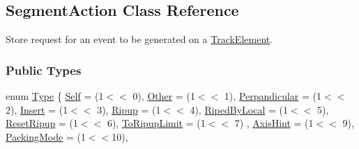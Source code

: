 \hypertarget{classKite_1_1SegmentAction}{}\subsection{Segment\+Action Class Reference}
\label{classKite_1_1SegmentAction}


Store request for an event to be generated on a \hyperlink{classKite_1_1TrackElement}{Track\+Element}.  


\subsubsection*{Public Types}
\begin{DoxyCompactItemize}
\item 
enum \hyperlink{classKite_1_1SegmentAction_a1d1cfd8ffb84e947f82999c682b666a7}{Type} \{ \newline
\hyperlink{classKite_1_1SegmentAction_a1d1cfd8ffb84e947f82999c682b666a7aacd3ef9d889b306ca7e7bdcd37ba659a}{Self} = (1$<$$<$ 0), 
\newline
\hyperlink{classKite_1_1SegmentAction_a1d1cfd8ffb84e947f82999c682b666a7a75f0c3176be2226dfe8ad164a0a034a2}{Other} = (1$<$$<$ 1), 
\newline
\hyperlink{classKite_1_1SegmentAction_a1d1cfd8ffb84e947f82999c682b666a7a02330ea306385a34162a1e620a1c37df}{Perpandicular} = (1$<$$<$ 2), 
\newline
\hyperlink{classKite_1_1SegmentAction_a1d1cfd8ffb84e947f82999c682b666a7a8c1f14f07c9eedcbbb2cc61988030646}{Insert} = (1$<$$<$ 3), 
\newline
\hyperlink{classKite_1_1SegmentAction_a1d1cfd8ffb84e947f82999c682b666a7a08900dc237aef7e4a7f50d2ba1ffd748}{Ripup} = (1$<$$<$ 4), 
\newline
\hyperlink{classKite_1_1SegmentAction_a1d1cfd8ffb84e947f82999c682b666a7a4fab9c042ba690bdb62d3c34eab8472d}{Riped\+By\+Local} = (1$<$$<$ 5), 
\newline
\hyperlink{classKite_1_1SegmentAction_a1d1cfd8ffb84e947f82999c682b666a7a9e16316a13899c2e02dd49cf2fb6e91f}{Reset\+Ripup} = (1$<$$<$ 6), 
\newline
\hyperlink{classKite_1_1SegmentAction_a1d1cfd8ffb84e947f82999c682b666a7a6c00c46010d69247a3edc18b70d700fa}{To\+Ripup\+Limit} = (1$<$$<$ 7)
, \newline
\hyperlink{classKite_1_1SegmentAction_a1d1cfd8ffb84e947f82999c682b666a7a46c4ca7a69b5eae786be28f75523b78b}{Axis\+Hint} = (1$<$$<$ 9), 
\newline
\hyperlink{classKite_1_1SegmentAction_a1d1cfd8ffb84e947f82999c682b666a7a4fe6b9a3b3816492b9a99ab6689c4b20}{Packing\+Mode} = (1$<$$<$10), 

\end{DoxyCompactItemize}
